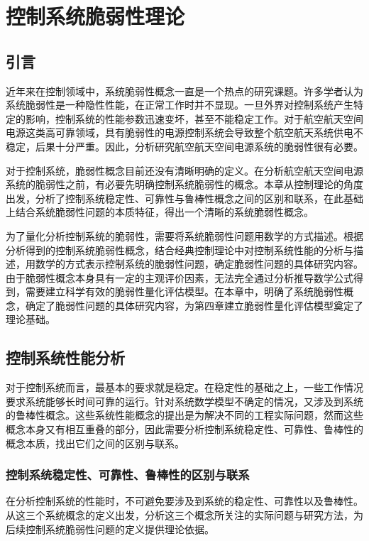 \chapter{控制系统脆弱性理论}
\label{cha:Fragility_Theory}
\section{引言}
\label{sec:chap3:int}
近年来在控制领域中，系统脆弱性概念一直是一个热点的研究课题。许多学者认为系统脆弱性是一种隐性性能，在正常工作时并不显现。一旦外界对控制系统产生特定的影响，控制系统的性能参数迅速变坏，甚至不能稳定工作。对于航空航天空间电源这类高可靠领域，具有脆弱性的电源控制系统会导致整个航空航天系统供电不稳定，后果十分严重。因此，分析研究航空航天空间电源系统的脆弱性很有必要。

对于控制系统，脆弱性概念目前还没有清晰明确的定义。在分析航空航天空间电源系统的脆弱性之前，有必要先明确控制系统脆弱性的概念。本章从控制理论的角度出发，分析了控制系统稳定性、可靠性与鲁棒性概念之间的区别和联系，在此基础上结合系统脆弱性问题的本质特征，得出一个清晰的系统脆弱性概念。

为了量化分析控制系统的脆弱性，需要将系统脆弱性问题用数学的方式描述。根据分析得到的控制系统脆弱性概念，结合经典控制理论中对控制系统性能的分析与描述，用数学的方式表示控制系统的脆弱性问题，确定脆弱性问题的具体研究内容。由于脆弱性概念本身具有一定的主观评价因素，无法完全通过分析推导数学公式得到，需要建立科学有效的脆弱性量化评估模型。在本章中，明确了系统脆弱性概念，确定了脆弱性问题的具体研究内容，为第四章建立脆弱性量化评估模型奠定了理论基础。
\section{控制系统性能分析}
\label{sec:chap3:ControlSystem_Analysis}
对于控制系统而言，最基本的要求就是稳定。在稳定性的基础之上，一些工作情况要求系统能够长时间可靠的运行。针对系统数学模型不确定的情况，又涉及到系统的鲁棒性概念\cite{Feng1995Robust,Kuntzevich1992Guaranteed}。这些系统性能概念的提出是为解决不同的工程实际问题，然而这些概念本身又有相互重叠的部分，因此需要分析控制系统稳定性、可靠性、鲁棒性的概念本质，找出它们之间的区别与联系。
\subsection{控制系统稳定性、可靠性、鲁棒性的区别与联系}
在分析控制系统的性能时，不可避免要涉及到系统的稳定性、可靠性以及鲁棒性。从这三个系统概念的定义出发，分析这三个概念所关注的实际问题与研究方法，为后续控制系统脆弱性问题的定义提供理论依据。


